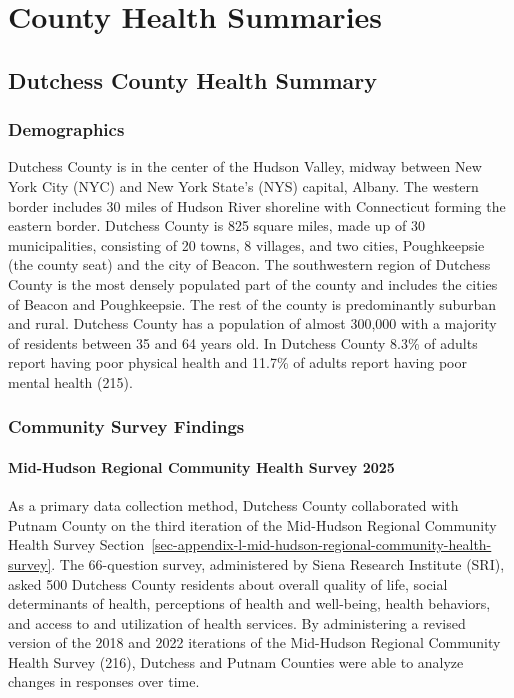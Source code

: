\documentclass[
  english,
  letterpaper,
]{report}
\begin{document}

\chapter{County Health Summaries}\label{county-health-summaries}

\section{Dutchess County Health
Summary}\label{dutchess-county-health-summary}

\subsection{Demographics}\label{demographics}

Dutchess County is in the center of the Hudson Valley, midway between
New York City (NYC) and New York State's (NYS) capital, Albany. The
western border includes 30 miles of Hudson River shoreline with
Connecticut forming the eastern border. Dutchess County is 825 square
miles, made up of 30 municipalities, consisting of 20 towns, 8 villages,
and two cities, Poughkeepsie (the county seat) and the city of Beacon.
The southwestern region of Dutchess County is the most densely populated
part of the county and includes the cities of Beacon and Poughkeepsie.
The rest of the county is predominantly suburban and rural. Dutchess
County has a population of almost 300,000 with a majority of residents
between 35 and 64 years old. In Dutchess County 8.3\% of adults report
having poor physical health and 11.7\% of adults report having poor
mental health (215).

\subsection{Community Survey Findings}\label{community-survey-findings}

\subsubsection{Mid-Hudson Regional Community Health Survey
2025}\label{mid-hudson-regional-community-health-survey-2025}

As a primary data collection method, Dutchess County collaborated with
Putnam County on the third iteration of the Mid-Hudson Regional
Community Health Survey
Section~\ref{sec-appendix-l-mid-hudson-regional-community-health-survey}.
The 66-question survey, administered by Siena Research Institute (SRI),
asked 500 Dutchess County residents about overall quality of life,
social determinants of health, perceptions of health and well-being,
health behaviors, and access to and utilization of health services. By
administering a revised version of the 2018 and 2022 iterations of the
Mid-Hudson Regional Community Health Survey (216), Dutchess and Putnam
Counties were able to analyze changes in responses over time.
\end{document}
